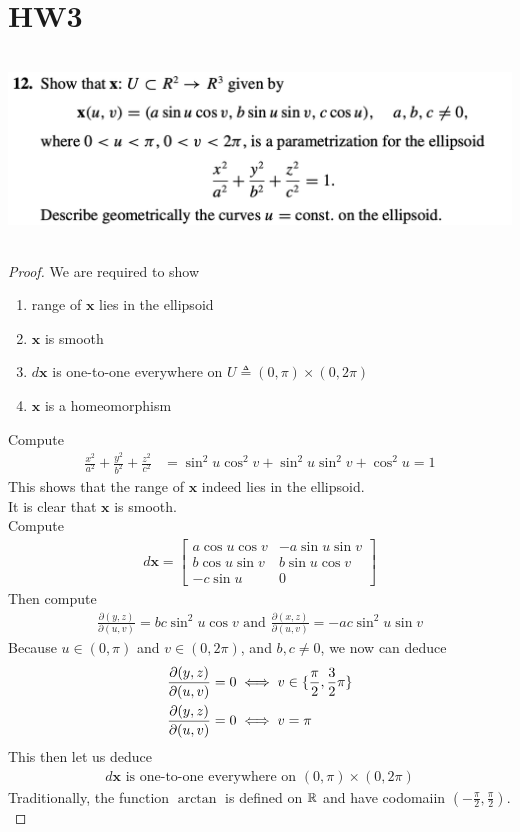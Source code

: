 \documentclass{report}
\begin{document}
\section{HW3}
\begin{question}{}{}
\includegraphics[height=5cm,width=18cm]{HW312}
\end{question}
\begin{proof}
We are required to show 
\begin{enumerate}[label=(\alph*)]
  \item range of $\textbf{x}$ lies in the ellipsoid
  \item $\textbf{x}$ is smooth 
  \item $d\textbf{x}$ is one-to-one everywhere on $U\triangleq (0,\pi)\times (0,2\pi)$ 
  \item $\textbf{x}$ is a homeomorphism
\end{enumerate}
Compute 
\begin{align*}
\frac{x^2}{a^2}+\frac{y^2}{b^2}+\frac{z^2}{c^2}&=\sin^2 u \cos^2 v + \sin^2 u \sin^2 v + \cos^2 u=1
\end{align*}
This shows that the range of  $\textbf{x}$ indeed lies in the ellipsoid.\\

It is clear that $\textbf{x}$ is smooth.\\

Compute 
\begin{align*}
d\textbf{x}=\begin{bmatrix}
  a\cos u \cos v & -a \sin u \sin v\\
  b \cos u \sin v & b \sin u \cos v \\
  -c \sin u & 0 
\end{bmatrix}
\end{align*}
Then compute
\begin{align*}
\frac{\partial (y,z)}{\partial (u,v)}=bc \sin^2 u \cos v\text{ and }\frac{\partial (x,z)}{\partial (u,v)}=-ac \sin^2 u \sin v
\end{align*}
Because $u \in (0,\pi)$ and $v \in (0,2\pi)$, and $b,c\neq 0$, we now can deduce
\begin{align*}
&\frac{\partial (y,z)}{\partial (u,v)}=0\iff v\in \{ \frac{\pi}{2},\frac{3}{2}\pi \}\\
&\frac{\partial (y,z)}{\partial (u,v)}=0\iff v=\pi 
\end{align*}
This then let us deduce 
\begin{align*}
d\textbf{x}\text{ is one-to-one everywhere on }(0,\pi)\times (0,2\pi)
\end{align*}
Traditionally, the function $\arctan$ is defined on $\mathbb{R}$ and have codomaiin $(-\frac{\pi}{2},\frac{\pi}{2})$.\\


\end{proof}
\end{document}
